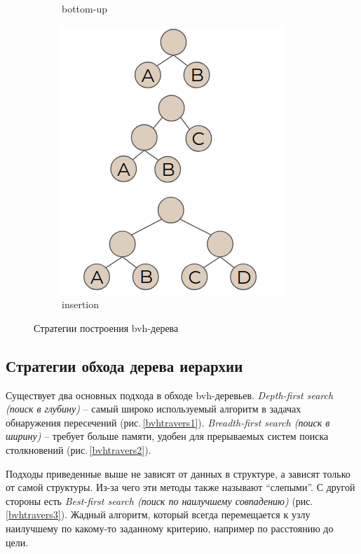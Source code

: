 \documentclass[11pt,a4paper]{extarticle}
\begin{document}
\begin{figure}[ht]
\begin{subfigure}{1.5in}
					\caption{bottom-up}
					\label{bvhcreate2}					
				\end{subfigure}
				\begin{subfigure}{1.5in}
					\includegraphics[width=\textwidth]{bvhcreate3}					
					\caption{insertion}
					\label{bvhcreate3}
			\end{subfigure}
				\caption{Стратегии построения bvh-дерева}
				\label{bvhcreate}
			\end{figure}

		\subsection{Стратегии обхода дерева иерархии}
			Существует два основных подхода в обходе bvh-деревьев. 
			\emph{Depth-first search (поиск в глубину)} -- самый широко используемый алгоритм в задачах обнаружения пересечений (рис.\,\ref{bvhtravers1}).
			\emph{Breadth-first search (поиск в ширину)} -- требует больше памяти, удобен для прерываемых систем поиска столкновений (рис.\,\ref{bvhtravers2}).
			
			Подходы приведенные выше не зависят от данных в структуре, а зависят только от самой структуры.
			Из-за чего эти методы также называют “слепыми”.
			С другой стороны есть \emph{Best-first search (поиск по наилучшему совпадению)} (рис.\,\ref{bvhtravers3}).
			Жадный алгоритм, который всегда перемещается к узлу наилучшему по какому-то заданному критерию, например по расстоянию до цели.
			
\end{document}
